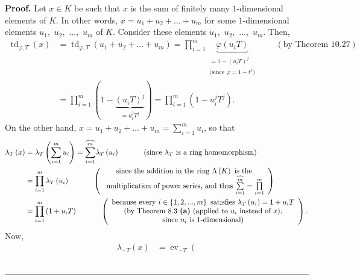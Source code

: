 \documentclass[numbers=enddot,12pt,final,onecolumn,notitlepage]{scrartcl}%
\newenvironment{proof}[1][Proof]{\noindent\textbf{#1.} }{\ \rule{0.5em}{0.5em}}
\begin{document}
\begin{proof}
Let $x\in K$ be such that $x$ is the sum of finitely many $1$-dimensional
elements of $K$. In other words, $x=u_{1}+u_{2}+...+u_{m}$ for some
$1$-dimensional elements $u_{1},$ $u_{2},$ $...,$ $u_{m}$ of $K$. Consider
these elements $u_{1},$ $u_{2},$ $...,$ $u_{m}$. Then,%
\begin{align*}
\operatorname*{td}\nolimits_{\varphi,T}\left(  x\right)   &
=\operatorname*{td}\nolimits_{\varphi,T}\left(  u_{1}+u_{2}+...+u_{m}\right)
=\prod\limits_{i=1}^{m}\underbrace{\varphi\left(  u_{i}T\right)
}_{\substack{=1-\left(  u_{i}T\right)  ^{j}\\\text{(since }\varphi
=1-t^{j}\text{)}}}\ \ \ \ \ \ \ \ \ \ \left(  \text{by Theorem 10.27}\right)
\\
&  =\prod\limits_{i=1}^{m}\left(  1-\underbrace{\left(  u_{i}T\right)  ^{j}%
}_{=u_{i}^{j}T^{j}}\right)  =\prod\limits_{i=1}^{m}\left(  1-u_{i}^{j}%
T^{j}\right)  .
\end{align*}
On the other hand, $x=u_{1}+u_{2}+...+u_{m}=\sum\limits_{i=1}^{m}u_{i}$, so
that%
\begin{align*}
\lambda_{T}\left(  x\right)   &  =\lambda_{T}\left(  \sum\limits_{i=1}%
^{m}u_{i}\right)  =\widehat{\sum\limits_{i=1}^{m}}\lambda_{T}\left(
u_{i}\right)  \ \ \ \ \ \ \ \ \ \ \left(  \text{since }\lambda_{T}\text{ is a
ring homomorphism}\right) \\
&  =\prod\limits_{i=1}^{m}\lambda_{T}\left(  u_{i}\right)
\ \ \ \ \ \ \ \ \ \ \left(
\begin{array}
[c]{c}%
\text{since the addition in the ring }\Lambda\left(  K\right)  \text{ is
the}\\
\text{ multiplication of power series, and thus }\widehat{\sum\limits_{i=1}%
^{m}}=\prod\limits_{i=1}^{m}%
\end{array}
\right) \\
&  =\prod\limits_{i=1}^{m}\left(  1+u_{i}T\right)  \ \ \ \ \ \ \ \ \ \ \left(
%
\begin{array}
[c]{c}%
\text{because every }i\in\left\{  1,2,...,m\right\}  \text{ satisfies }%
\lambda_{T}\left(  u_{i}\right)  =1+u_{i}T\\
\text{(by Theorem 8.3 \textbf{(a)} (applied to }u_{i}\text{ instead of
}x\text{),}\\
\text{since }u_{i}\text{ is }1\text{-dimensional)}%
\end{array}
\right)  .
\end{align*}
Now,%
\begin{align*}
\lambda_{-T}\left(  x\right)   &  =\operatorname*{ev}\nolimits_{-T}\left(

\end{align*}
\end{proof}
\end{document}
